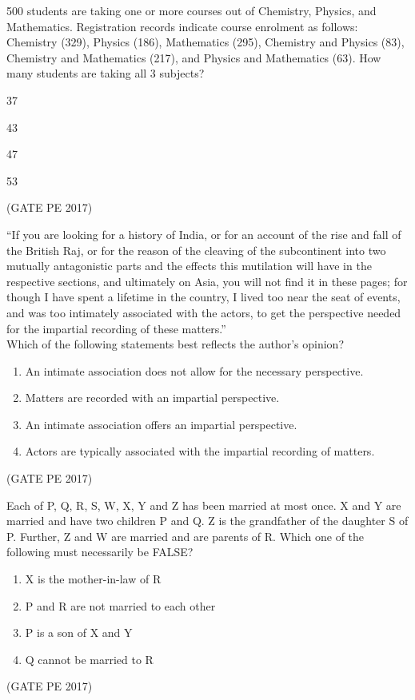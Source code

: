 \documentclass[journal,12pt,onecolumn]{IEEEtran}
\theoremstyle{remark}
\begin{document}
\begin{enumerate}
{\item 500 students are taking one or more courses out of Chemistry, Physics, and Mathematics. Registration records indicate course enrolment as follows: Chemistry (329), Physics (186), Mathematics (295), Chemistry and Physics (83), Chemistry and Mathematics (217), and Physics and Mathematics (63). How many students are taking all 3 subjects?
\begin{enumerate}
\begin{multicols}{4}
\item 37
\item 43
\item 47
\item 53
\end{multicols}
\end{enumerate}
\hfill{(GATE PE 2017)}


\item ``If you are looking for a history of India, or for an account of the rise and fall of the British Raj, or for the reason of the cleaving of the subcontinent into two mutually antagonistic parts and the effects this mutilation will have in the respective sections, and ultimately on Asia, you will not find it in these pages; for though I have spent a lifetime in the country, I lived too near the seat of events, and was too intimately associated with the actors, to get the perspective needed for the impartial recording of these matters.''\\
Which of the following statements best reflects the author's opinion?
\begin{enumerate}
\item An intimate association does not allow for the necessary perspective.
\item Matters are recorded with an impartial perspective.
\item An intimate association offers an impartial perspective.
\item Actors are typically associated with the impartial recording of matters.
\end{enumerate}
\hfill{(GATE PE 2017)}

\item Each of P, Q, R, S, W, X, Y and Z has been married at most once. X and Y are married and have two children P and Q. Z is the grandfather of the daughter S of P. Further, Z and W are married and are parents of R. Which one of the following must necessarily be FALSE?
\begin{enumerate}
\item X is the mother-in-law of R
\item P and R are not married to each other
\item P is a son of X and Y
\item Q cannot be married to R
\end{enumerate}
\hfill{(GATE PE 2017)}

}
\end{enumerate}
\end{document}
